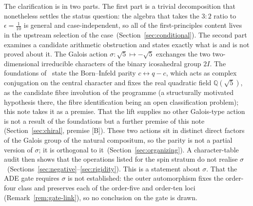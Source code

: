 \documentclass[11pt]{article}
\theoremstyle{definition}
\theoremstyle{remark}
\begin{document}
    The clarification is in two parts.
    The first part is a trivial decomposition that nonetheless settles the status question: the algebra that takes the
    $3:2$ ratio to $\epsilon=\tfrac{1}{10}$ is general and case-independent, so all of the first-principles content lives
    in the upstream selection of the case~(Section~\ref{sec:conditional}).
    The second part examines a candidate arithmetic obstruction and states exactly what is and is not proved about it.
    The Galois action $\sigma:\sqrt{5}\mapsto-\sqrt{5}$ exchanges the two two-dimensional irreducible characters of the
    binary icosahedral group $2I$.
        The foundations of~\cite{Beau2026m} state the Born--Infeld parity $c\leftrightarrow q-c$, which acts as complex
    conjugation on the central character and fixes the real quadratic field $\mathbb{Q}(\sqrt{5})$, as the candidate
    fibre involution of the programme (a structurally motivated hypothesis there, the fibre identification being an
    open classification problem); this note takes it as a premise.
    That the lift supplies no other Galois-type action is not a result of the foundations but a further premise of this
    note (Section~\ref{sec:chiral}, premise [B]).
    These two actions sit in distinct direct factors of the Galois group of the natural compositum, so the parity is not
    a partial version of $\sigma$; it is orthogonal to it~(Section~\ref{sec:organizing}).
    A character-table audit then shows that the operations listed for the spin stratum do not realise
    $\sigma$~(Sections~\ref{sec:negative}--\ref{sec:rigidity}).
    This is a statement about $\sigma$.
    That the ADE gate requires $\sigma$ is not established: the outer automorphism fixes the order-four class and
    preserves each of the order-five and order-ten loci (Remark~\ref{rem:gate-link}), so no conclusion on the gate is
    drawn.
\end{document}
